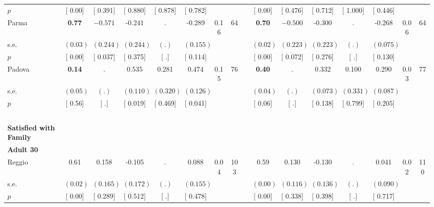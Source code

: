 \begin{longtable}{L{8em} c c c c c c c p{1em} c c c c c c c}
\quad \quad \quad \quad $ p$ & [     0.00] & [    0.391] & [    0.880] & [    0.878] & [    0.782] & & & & [     0.00] & [    0.476] & [    0.712] & [    1.000] & [    0.446] & &  \\[1em]
\quad \quad \quad Parma& \textbf{     0.77} & $ \mathbf{   -0.571}$ &    -0.241 &         . &    -0.289 &      0.16 &        64 & & \textbf{     0.70} & $ \mathbf{   -0.500}$ &    -0.300 &         . &    -0.268 &      0.06 &        64  \\*
\quad \quad \quad \quad s.e.& $ (     0.03)$ & $ (    0.244)$ & $ (    0.244)$ & $ (        .)$ & $ (    0.155)$ & & & & $ (     0.02)$ & $ (    0.223)$ & $ (    0.223)$ & $ (        .)$ & $ (    0.075)$ & &  \\*
\quad \quad \quad \quad $ p$ & [     0.00] & [    0.037] & [    0.375] & [        .] & [    0.114] & & & & [     0.00] & [    0.072] & [    0.276] & [        .] & [    0.130] & &  \\[1em]
\quad \quad \quad Padova& \textbf{     0.14} &         . & $ \mathbf{    0.535}$ &     0.281 & $ \mathbf{    0.474}$ &      0.15 &        76 & & \textbf{     0.40} &         . &     0.332 &     0.100 &     0.290 &      0.03 &        77  \\*
\quad \quad \quad \quad s.e.& $ (     0.05)$ & $ (        .)$ & $ (    0.110)$ & $ (    0.320)$ & $ (    0.126)$ & & & & $ (     0.04)$ & $ (        .)$ & $ (    0.073)$ & $ (    0.331)$ & $ (    0.087)$ & &  \\*
\quad \quad \quad \quad $ p$ & [     0.56] & [        .] & [    0.019] & [    0.469] & [    0.041] & & & & [     0.06] & [        .] & [    0.138] & [    0.799] & [    0.205] & &  \\[1em]
~\\[1em]
\textbf{Satisfied with Family} \\*
\quad \quad \textbf{Adult 30} & & & & & & & & & & & & & & & \\* 
\quad \quad \quad Reggio& 0.61 &     0.158 &    -0.105 &         . &     0.088 &      0.04 &       103 & & 0.59 &     0.130 &    -0.130 &         . &     0.041 &      0.02 &       110  \\*
\quad \quad \quad \quad s.e.& $ (     0.02)$ & $ (    0.165)$ & $ (    0.172)$ & $ (        .)$ & $ (    0.155)$ & & & & $ (     0.00)$ & $ (    0.116)$ & $ (    0.136)$ & $ (        .)$ & $ (    0.090)$ & &  \\*
\quad \quad \quad \quad $ p$ & [     0.00] & [    0.289] & [    0.512] & [        .] & [    0.478] & & & & [     0.00] & [    0.338] & [    0.398] & [        .] & [    0.717] & &  \\[1em]

\end{longtable}
